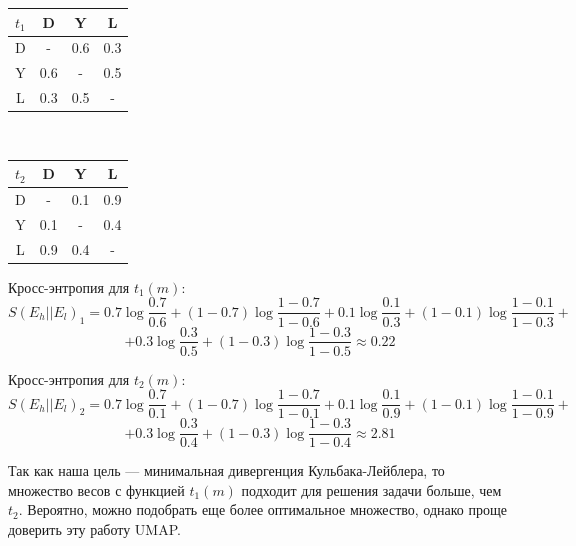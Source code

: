 \begin{center}
	\begin{multicols}{2}
		\begin{tabular}{|c||c|c|c|}
			\hline
			$t_1$ & D & Y & L\\
			\hline
			\hline
			D & - & 0.6 & 0.3\\
			\hline
			Y & 0.6 & - & 0.5\\
			\hline
			L & 0.3 & 0.5 & -\\
			\hline
		\end{tabular}\\
		\begin{tabular}{|c||c|c|c|}
			\hline
			$t_2$ & D & Y & L\\
			\hline
			\hline
			D & - & 0.1 & 0.9\\
			\hline
			Y & 0.1 & - & 0.4\\
			\hline
			L & 0.9 & 0.4 & -\\
			\hline
		\end{tabular}
	\end{multicols}
\end{center}

Кросс-энтропия для $t_1(m)$:
\[S(E_h||E_l)_1 = 0.7\log \frac{0.7}{0.6} + (1-0.7)\log \frac{1-0.7}{1-0.6} + 0.1\log \frac{0.1}{0.3} + (1-0.1)\log \frac{1-0.1}{1-0.3}+\] \[+ 0.3\log \frac{0.3}{0.5} + (1-0.3)\log \frac{1-0.3}{1-0.5} \approx 0.22\]

Кросс-энтропия для $t_2(m)$:
\[S(E_h||E_l)_2 = 0.7\log \frac{0.7}{0.1} + (1-0.7)\log \frac{1-0.7}{1-0.1} + 0.1\log \frac{0.1}{0.9} + (1-0.1)\log \frac{1-0.1}{1-0.9} +\]\[+ 0.3\log \frac{0.3}{0.4} + (1-0.3)\log \frac{1-0.3}{1-0.4} \approx 2.81\]

Так как наша цель --- минимальная дивергенция Кульбака-Лейблера, то множество весов с функцией $t_1(m)$ подходит для решения задачи больше, чем $t_2$. Вероятно, можно подобрать еще более оптимальное множество, однако проще доверить эту работу UMAP.